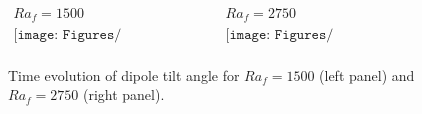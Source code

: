 \begin{figure}[ht]
\begin{center}
\[
\begin{array}{cc}
Ra_f = 1500 & Ra_f = 2750 \\
\texttt{[image: Figures/sph\_shell\_276\_tilt.pdf]} &
\texttt{[image: Figures/sph\_shell\_272\_tilt.pdf]} \\
\end{array}
\]
\end{center}
\caption{
Time evolution of dipole tilt angle for $Ra_f = 1500$ (left panel) and $Ra_f = 2750$ (right panel).
}
\label{Fig:more_cases}
\end{figure}